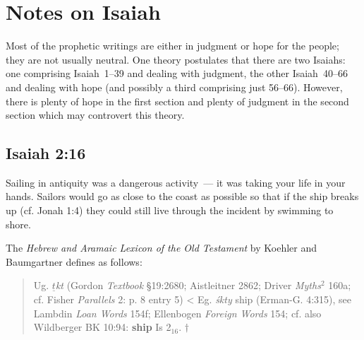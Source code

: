 \chapter{Notes on Isaiah}\label{app:isaiah}
Most of the prophetic writings are either in judgment or hope for the people; they are not usually neutral. One theory postulates that there are two Isaiahs: one comprising Isaiah~1--39 and dealing with judgment, the other Isaiah~40--66 and dealing with hope (and possibly a third comprising just 56--66). However, there is plenty of hope in the first section and plenty of judgment in the second section which may controvert this theory.

\section{Isaiah 2:16}\label{app:isa-2-16}
Sailing in antiquity was a dangerous activity~--- it was taking your life in your hands. Sailors would go as close to the coast as possible so that if the ship breaks up (cf. Jonah 1:4) they could still live through the incident by swimming to shore.

The \emph{Hebrew and Aramaic Lexicon of the Old Testament} by Koehler and Baumgartner defines  as follows:
\begin{quote}
    Ug. \emph{$\underline{t}$kt} (Gordon \emph{Textbook} \S19:2680; Aistleitner 2862; Driver \emph{Myths}$^2$ 160a; cf. Fisher \emph{Parallels} 2: p. 8 entry 5) < Eg. \emph{\'skty} ship (Erman-G. 4:315), see Lambdin \emph{Loan Words} 154f; Ellenbogen \emph{Foreign Words} 154; cf. also Wildberger BK 10:94: \textbf{ship} Is 2$_{16}$. $\dagger$
\end{quote}


